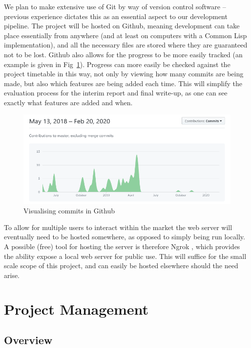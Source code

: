 \documentclass[10pt,a4paper]{article}
\theoremstyle{plain}
\theoremstyle{definition}
\begin{document}
	We plan to make extensive use of Git \cite{Git} by way of version control
	software -- previous experience dictates this as an essential aspect to our
	development pipeline. The project will be hosted on Github, meaning
	development can take place essentially from anywhere (and at least on
	computers with a Common Lisp implementation), and all the necessary files
	are stored where they are guaranteed not to be lost. Github also allows for
	the progress to be more easily tracked (an example is given in
	Fig~\ref{fig:commit_graph}). Progress can more easily be checked against
	the project timetable in this way, not only by viewing how many commits are
	being made, but also which features are being added each time. This will
	simplify the evaluation process for the interim report and final write-up,
	as one can see exactly what features are added and when.

	\begin{figure}[h]
		\centering
		\includegraphics[width=.8\textwidth]{commits.png}
		\caption{Visualising commits in Github}
		\label{fig:commit_graph}
	\end{figure}
	
	To allow for multiple users to interact within the market the web server
	will eventually need to be hosted somewhere, as opposed to simply being run
	locally. A possible (free) tool for hosting the server is therefore Ngrok
	\cite{ngrok}, which provides the ability expose a local web server for
	public use. This will suffice for the small scale scope of this project,
	and can easily be hosted elsewhere should the need arise.

\section{Project Management}
	\label{sec:projectManagement}

	\subsection{Overview}
\end{document}
